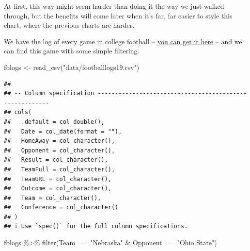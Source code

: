 \documentclass[
]{book}
\newenvironment{Shaded}{\begin{snugshade}}{\end{snugshade}}
\newcommand{\FunctionTok}[1]{\textcolor[rgb]{0.00,0.00,0.00}{#1}}
\newcommand{\NormalTok}[1]{#1}
\newcommand{\OtherTok}[1]{\textcolor[rgb]{0.56,0.35,0.01}{#1}}
\newcommand{\SpecialCharTok}[1]{\textcolor[rgb]{0.00,0.00,0.00}{#1}}
\newcommand{\StringTok}[1]{\textcolor[rgb]{0.31,0.60,0.02}{#1}}
\begin{document}
At first, this way might seem harder than doing it the way we just walked through, but the benefits will come later when it's far, far easier to style this chart, where the previous charts are harder.

We have the log of every game in college football -- \href{https://unl.box.com/s/2prgq48ctoxlukn6kmfjw0u1opda5s0m}{you can get it here} -- and we can find this game with some simple filtering.

\begin{Shaded}
\begin{Highlighting}[]
\NormalTok{fblogs }\OtherTok{\textless{}{-}} \FunctionTok{read\_csv}\NormalTok{(}\StringTok{"data/footballlogs19.csv"}\NormalTok{)}
\end{Highlighting}
\end{Shaded}

\begin{verbatim}
## 
## -- Column specification --------------------------------------------------------
## cols(
##   .default = col_double(),
##   Date = col_date(format = ""),
##   HomeAway = col_character(),
##   Opponent = col_character(),
##   Result = col_character(),
##   TeamFull = col_character(),
##   TeamURL = col_character(),
##   Outcome = col_character(),
##   Team = col_character(),
##   Conference = col_character()
## )
## i Use `spec()` for the full column specifications.
\end{verbatim}

\begin{Shaded}
\begin{Highlighting}[]
\NormalTok{fblogs }\SpecialCharTok{\%\textgreater{}\%} \FunctionTok{filter}\NormalTok{(Team }\SpecialCharTok{==} \StringTok{"Nebraska"} \SpecialCharTok{\&}\NormalTok{ Opponent }\SpecialCharTok{==} \StringTok{"Ohio State"}\NormalTok{)}
\end{Highlighting}
\end{Shaded}
\end{document}
